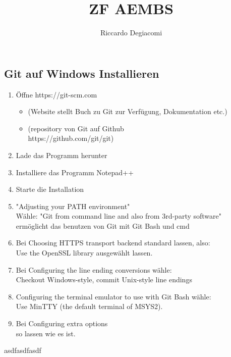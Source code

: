 \documentclass[a4paper, 8pt]{extarticle}
\title{ZF AEMBS}
\author{Riccardo Degiacomi}
\begin{document}
    \begin{multicols*}{3}
        \section{Git auf Windows Installieren}
                \begin{enumerate}
                    \item   Öffne https://git-scm.com
                        \begin{itemize}
                            \item   (Website stellt Buch zu Git zur Verfügung, Dokumentation etc.)
                            \item   (repository von Git auf Github\\
                            https://github.com/git/git)
                        \end{itemize}
                    \item   Lade das Programm herunter
                    \item   Installiere das Programm Notepad++
                    \item   Starte die Installation
                    \item   "Adjusting your PATH environment"\\Wähle: "Git from command line and also from 3rd-party software"\\ermöglicht das benutzen von Git mit Git Bash und cmd
                    \item   Bei Choosing HTTPS transport backend standard lassen, also:\\Use the OpenSSL library ausgewählt lassen.
                    \item   Bei Configuring the line ending conversions wähle:\\Checkout Windows-style, commit Unix-style line endings
                    \item   Configuring the terminal emulator to use with Git Bash wähle:\\Use MinTTY (the default terminal of MSYS2).
                    \item   Bei Configuring extra options\\ so lassen wie es ist.
                \end{enumerate}
asdfasdfasdf

\end{multicols*}
\end{document}
